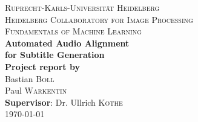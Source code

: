 \begin{titlepage}
    \center

    \textsc{\LARGE Ruprecht-Karls-Universität Heidelberg} \\[1cm]
    \textsc{\large Heidelberg Collaboratory for Image Processing} \\[2.5cm]
    \textsc{\Large Fundamentals of Machine Learning} \\[3cm]

    {\Huge \bfseries Automated Audio Alignment\\ for Subtitle Generation} \\[2cm]

    {\large \textbf{Project report by}} \\[0.1cm]
    Bastian \textsc{Boll} \\
    Paul \textsc{Warkentin} \\[0.5cm]

    \textbf{Supervisor}: Dr. Ullrich \textsc{Köthe} \\[2cm]

    {\large \today}

    \vspace{\fill}
\end{titlepage}
